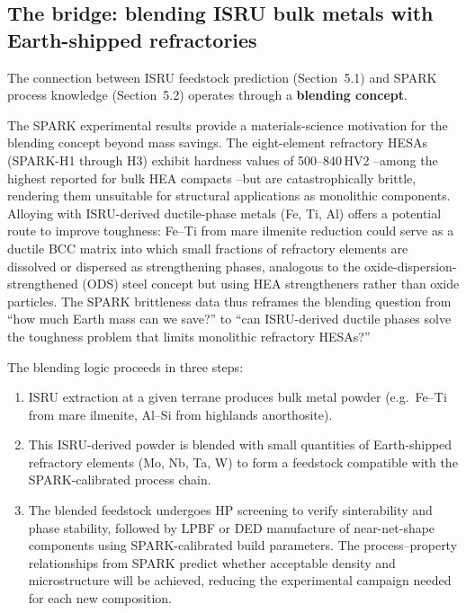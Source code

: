 \documentclass[11pt,a4paper]{article}
\begin{document}
\subsection{The bridge: blending ISRU bulk metals with Earth-shipped refractories}
\label{subsec:blending}

The connection between ISRU feedstock prediction (Section~5.1) and SPARK process knowledge (Section~5.2) operates through a \textbf{blending concept}.

The SPARK experimental results provide a materials-science motivation for the blending concept beyond mass savings. The eight-element refractory HESAs (SPARK-H1 through H3) exhibit hardness values of 500--840\,HV2 --among the highest reported for bulk HEA compacts --but are catastrophically brittle, rendering them unsuitable for structural applications as monolithic components. Alloying with ISRU-derived ductile-phase metals (Fe, Ti, Al) offers a potential route to improve toughness: Fe--Ti from mare ilmenite reduction could serve as a ductile BCC matrix into which small fractions of refractory elements are dissolved or dispersed as strengthening phases, analogous to the oxide-dispersion-strengthened (ODS) steel concept but using HEA strengtheners rather than oxide particles. The SPARK brittleness data thus reframes the blending question from ``how much Earth mass can we save?'' to ``can ISRU-derived ductile phases solve the toughness problem that limits monolithic refractory HESAs?''

The blending logic proceeds in three steps:

\begin{enumerate}[leftmargin=1.4em]
  \item ISRU extraction at a given terrane produces bulk metal powder (e.g.\ Fe--Ti from mare ilmenite, Al--Si from highlands anorthosite).
  \item This ISRU-derived powder is blended with small quantities of Earth-shipped refractory elements (Mo, Nb, Ta, W) to form a feedstock compatible with the SPARK-calibrated process chain.
  \item The blended feedstock undergoes HP screening to verify sinterability and phase stability, followed by LPBF or DED manufacture of near-net-shape components using SPARK-calibrated build parameters. The process--property relationships from SPARK predict whether acceptable density and microstructure will be achieved, reducing the experimental campaign needed for each new composition.
\end{enumerate}
\end{document}
